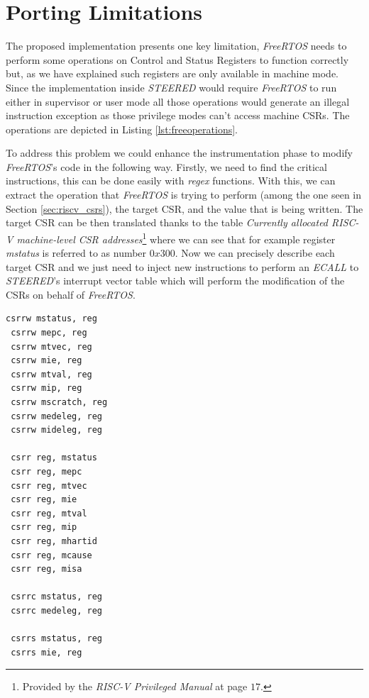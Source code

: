 \section{Porting Limitations}
\label{sec:rtos_limitations}

The proposed implementation presents one key limitation, \textit{FreeRTOS} needs
to perform some operations on Control and Status Registers to function correctly
but, as we have explained such registers are only available in machine mode. Since
the implementation inside \textit{STEERED} would require \textit{FreeRTOS} to run
either in supervisor or user mode all those operations would generate an illegal
instruction exception as those privilege modes can't access machine CSRs. The
operations are depicted in Listing \ref{lst:freeoperations}.

To address this problem we could enhance the instrumentation phase to modify
\textit{FreeRTOS}'s code in the following way. Firstly, we need to find the critical
instructions, this can be done easily with \textit{regex} functions. With this, we
can extract the operation that \textit{FreeRTOS} is trying to perform (among the
one seen in Section \ref{sec:riscv_csrs}), the target CSR, and the value that is
being written. The target CSR can be then translated thanks to the table \textit{Currently
allocated RISC-V machine-level CSR addresses}\footnote{Provided by the \textit{RISC-V
Privileged Manual}\cite{riscv} at page $17$.} where we can see that for example register
\textit{mstatus} is referred to as number $0x300$. Now we can precisely describe
each target CSR and we just need to inject new instructions to perform an \textit{ECALL}
to \textit{STEERED}'s interrupt vector table which will perform the modification
of the CSRs on behalf of \textit{FreeRTOS}. \\ \begin{lstlisting}[style=Assembly, caption = \textit{FreeRTOS} operations on Control and Status Registers, label={lst:freeoperations}]
 csrrw mstatus, reg
 csrrw mepc, reg
 csrrw mtvec, reg
 csrrw mie, reg
 csrrw mtval, reg
 csrrw mip, reg
 csrrw mscratch, reg
 csrrw medeleg, reg
 csrrw mideleg, reg

 csrr reg, mstatus
 csrr reg, mepc
 csrr reg, mtvec
 csrr reg, mie
 csrr reg, mtval
 csrr reg, mip
 csrr reg, mhartid
 csrr reg, mcause
 csrr reg, misa

 csrrc mstatus, reg
 csrrc medeleg, reg

 csrrs mstatus, reg
 csrrs mie, reg
\end{lstlisting}

